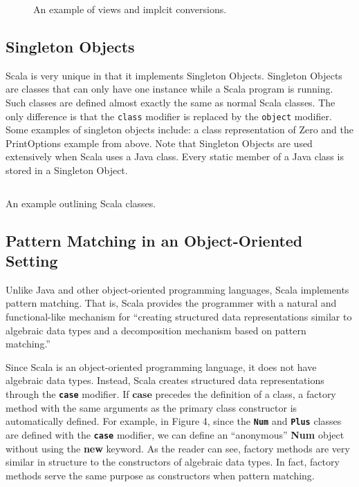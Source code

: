 \documentclass[jou,apacite]{IEEEtran}
\begin{document}
\begin{figure}
  \inputminted{Scala}{../examples/Set.scala}
  \caption{An example of views and implcit conversions.}
  \label{lst:nats-example}
\end{figure}

\subsection{Singleton Objects}
\label{sec:singleton-objects}

Scala is very unique in that it implements Singleton Objects. Singleton Objects
are classes that can only have one instance while a Scala program is
running. Such classes are defined almost exactly the same as normal Scala
classes. The only difference is that the \texttt{class} modifier is replaced by
the \texttt{object} modifier. Some examples of singleton objects include: a
class representation of Zero and the PrintOptions example from above. Note that
Singleton Objects are used extensively when Scala uses a Java class. Every
static member of a Java class is stored in a Singleton Object.

\begin{listing}
  \inputminted[frame=single]{Scala}{../examples/Nat.scala}
  \caption{An example outlining Scala classes.}
  \label{lst:nats-example}
\end{listing}

\subsection{Pattern Matching in an Object-Oriented Setting}
Unlike Java and other object-oriented programming languages, Scala implements
pattern matching. That is, Scala provides the programmer with a natural and
functional-like mechanism for ``creating structured data representations similar
to algebraic data types and a decomposition mechanism based on pattern
matching.''

Since Scala is an object-oriented programming language, it does not have
algebraic data types. Instead, Scala creates structured data representations
through the \texttt{\textbf{case}} modifier. If $\textbf{case}$ precedes the
definition of a class, a factory method with the same arguments as the primary
class constructor is automatically defined. For example, in Figure 4, since the
\texttt{\textbf{Num}} and \texttt{\textbf{Plus}} classes are defined with the
\texttt{\textbf{case}} modifier, we can define an “anonymous” \textbf{Num}
object without using the \textbf{new} keyword. As the reader can see, factory
methods are very similar in structure to the constructors of algebraic data
types. In fact, factory methods serve the same purpose as constructors when
pattern matching.
\end{document}
